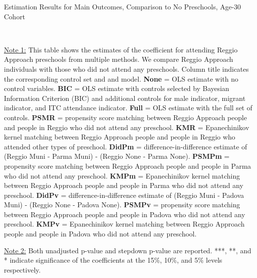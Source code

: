\begin{table}[H] \caption{Estimation Results for Main Outcomes, Comparison to No Preschools, Age-30 Cohort} \label{ols-M-adult30-reg-nopres}
\scalebox{0.6}{}
\vspace{1ex} \\
\footnotesize\raggedright{\underline{Note 1:} This table shows the estimates of the coefficient for attending Reggio Approach preschools from multiple methods. We compare Reggio Approach individuals with those who did not attend any preschools. Column title indicates the corresponding control set and and model. \textbf{None} = OLS estimate with no control variables. \textbf{BIC} = OLS estimate with controls selected by Bayesian Information Criterion (BIC) and additional controls for male indicator, migrant indicator, and ITC attendance indicator. \textbf{Full} = OLS estimate with the full set of controls. \textbf{PSMR} =  propensity score matching between Reggio Approach people and people in Reggio who did not attend any preschool. \textbf{KMR} = Epanechinikov kernel matching between Reggio Approach people and people in Reggio who attended other types of preschool. \textbf{DidPm} = difference-in-difference estimate of (Reggio Muni - Parma Muni) - (Reggio None - Parma None). \textbf{PSMPm} = propensity score matching between Reggio Approach people and people in Parma who did not attend any preschool. \textbf{KMPm} = Epanechinikov kernel matching between Reggio Approach people and people in Parma who did not attend any preschool. \textbf{DidPv} = difference-in-difference estimate of (Reggio Muni - Padova Muni) - (Reggio None - Padova None). \textbf{PSMPv} = propensity score matching between Reggio Approach people and people in Padova who did not attend any preschool. \textbf{KMPv} = Epanechinikov kernel matching between Reggio Approach people and people in Padova who did not attend any preschool.}

\footnotesize\raggedright{\underline{Note 2:} Both unadjusted p-value and stepdown p-value are reported. ***, **, and * indicate significance of the coefficients at the 15\%, 10\%, and 5\% levels respectively.}
\end{table}


